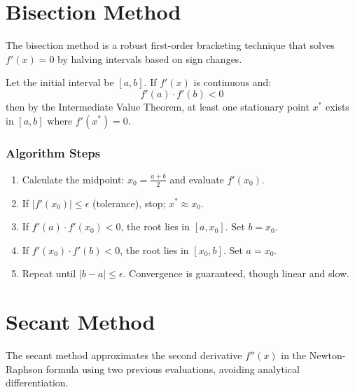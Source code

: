 \documentclass[12pt,a4paper]{article}
\begin{document}
\section{Bisection Method}

The bisection method is a robust first-order bracketing technique that solves $f'(x) = 0$ by halving intervals based on sign changes.

\begin{tcolorbox}[defbox, title={Bisection Criterion}]
Let the initial interval be $[a, b]$. If $f'(x)$ is continuous and:
\begin{equation}
  f'(a) \cdot f'(b) < 0
\end{equation}
then by the Intermediate Value Theorem, at least one stationary point $x^*$ exists in $[a, b]$ where $f'(x^*) = 0$.
\end{tcolorbox}

\subsubsection{Algorithm Steps}
\begin{enumerate}[label=\textbf{\arabic*.}, leftmargin=*, itemsep=2.5pt]
  \item Calculate the midpoint: $x_0 = \frac{a+b}{2}$ and evaluate $f'(x_0)$.
  \item If $|f'(x_0)| \le \epsilon$ (tolerance), stop; $x^* \approx x_0$.
  \item If $f'(a) \cdot f'(x_0) < 0$, the root lies in $[a, x_0]$. Set $b = x_0$.
  \item If $f'(x_0) \cdot f'(b) < 0$, the root lies in $[x_0, b]$. Set $a = x_0$.
  \item Repeat until $|b-a| \le \epsilon$. Convergence is guaranteed, though linear and slow.
\end{enumerate}

\section{Secant Method}

The secant method approximates the second derivative $f''(x)$ in the Newton-Raphson formula using two previous evaluations, avoiding analytical differentiation.
\end{document}
